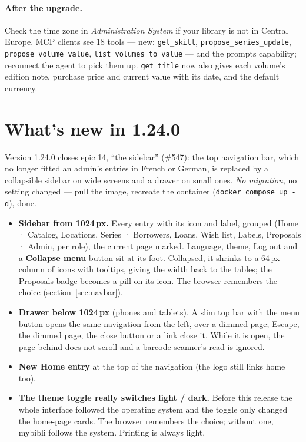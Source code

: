 \paragraph{After the upgrade.} Check the time zone in
\emph{Administration \textrightarrow{} System} if your library is not
in Central Europe. MCP clients see 18 tools --- new:
\texttt{get\_skill}, \texttt{propose\_series\_update},
\texttt{propose\_volume\_value}, \texttt{list\_volumes\_to\_value}
--- and the prompts capability; reconnect the agent to pick them up.
\texttt{get\_title} now also gives each volume's edition note,
purchase price and current value with its date, and the default
currency.

\section{What's new in 1.24.0}\label{sec:whats-new-1.24.0}

Version 1.24.0 closes epic 14, ``the sidebar''
(\href{https://github.com/guycorbaz/mybibli/issues/547}{\#547}): the
top navigation bar, which no longer fitted an admin's entries in French
or German, is replaced by a collapsible sidebar on wide screens and a
drawer on small ones. \emph{No migration}, no setting changed --- pull
the image, recreate the container (\texttt{docker compose up -d}),
done.

\begin{itemize}
  \item \textbf{Sidebar from 1024\,px.} Every entry with its icon and
        label, grouped (Home · Catalog, Locations, Series
        · Borrowers, Loans, Wish list, Labels, Proposals
        · Admin, per role), the current page marked. Language,
        theme, Log out and a \textbf{Collapse menu} button sit at its
        foot. Collapsed, it shrinks to a 64\,px column of icons with
        tooltips, giving the width back to the tables; the Proposals
        badge becomes a pill on its icon. The browser remembers the
        choice (section~\ref{sec:navbar}).
  \item \textbf{Drawer below 1024\,px} (phones and tablets). A slim top
        bar with the menu button opens the same navigation from the
        left, over a dimmed page; Escape, the dimmed page, the close
        button or a link close it. While it is open, the page behind
        does not scroll and a barcode scanner's read is ignored.
  \item \textbf{New Home entry} at the top of the navigation (the logo
        still links home too).
  \item \textbf{The theme toggle really switches light / dark.} Before
        this release the whole interface followed the operating system
        and the toggle only changed the home-page cards. The browser
        remembers the choice; without one, mybibli follows the system.
        Printing is always light.
\end{itemize}

